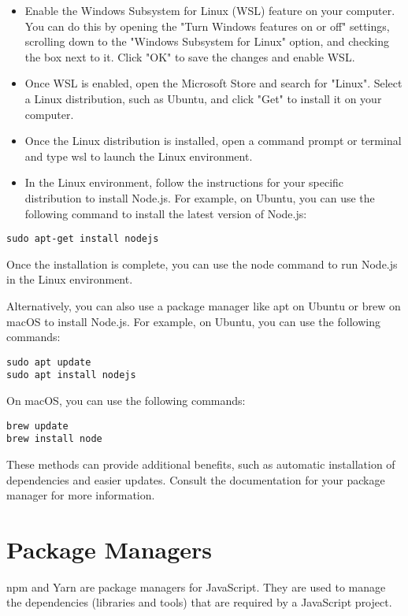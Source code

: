 {\begin{itemize}
\item Enable the Windows Subsystem for Linux (WSL) feature on your computer. You can do this by opening the "Turn Windows features on or off" settings, scrolling down to the "Windows Subsystem for Linux" option, and checking the box next to it. Click "OK" to save the changes and enable WSL.
\item Once WSL is enabled, open the Microsoft Store and search for "Linux". Select a Linux distribution, such as Ubuntu, and click "Get" to install it on your computer.
\item Once the Linux distribution is installed, open a command prompt or terminal and type wsl to launch the Linux environment.
\item In the Linux environment, follow the instructions for your specific distribution to install Node.js. For example, on Ubuntu, you can use the following command to install the latest version of Node.js:
\end{itemize}
\begin{verbatim}
sudo apt-get install nodejs
\end{verbatim}

Once the installation is complete, you can use the node command to run Node.js in the Linux environment.


Alternatively, you can also use a package manager like apt on Ubuntu or brew on macOS to install Node.js. For example, on Ubuntu, you can use the following commands:

\begin{verbatim}
sudo apt update
sudo apt install nodejs
\end{verbatim}

On macOS, you can use the following commands:
\begin{verbatim}
brew update
brew install node
\end{verbatim}

These methods can provide additional benefits, such as automatic installation of dependencies and easier updates. Consult the documentation for your package manager for more information.

\section{Package Managers}
npm and Yarn are package managers for JavaScript. They are used to manage the dependencies (libraries and tools) that are required by a JavaScript project.

}
